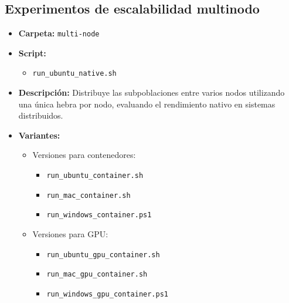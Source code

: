 \subsection{Experimentos de escalabilidad multinodo}
\begin{itemize}
    \item \textbf{Carpeta:} \texttt{multi-node}
    \item \textbf{Script:}
          \begin{itemize}
              \item \texttt{run\_ubuntu\_native.sh}
          \end{itemize}
    \item \textbf{Descripción:} Distribuye las subpoblaciones entre varios nodos utilizando una única hebra por nodo, evaluando el rendimiento nativo en sistemas distribuidos.
    \item \textbf{Variantes:}
          \begin{itemize}
              \item Versiones para contenedores:
                    \begin{itemize}
                        \item \texttt{run\_ubuntu\_container.sh}
                        \item \texttt{run\_mac\_container.sh}
                        \item \texttt{run\_windows\_container.ps1}
                    \end{itemize}
              \item Versiones para GPU:
                    \begin{itemize}
                        \item \texttt{run\_ubuntu\_gpu\_container.sh}
                        \item \texttt{run\_mac\_gpu\_container.sh}
                        \item \texttt{run\_windows\_gpu\_container.ps1}
                    \end{itemize}
          \end{itemize}
\end{itemize}

